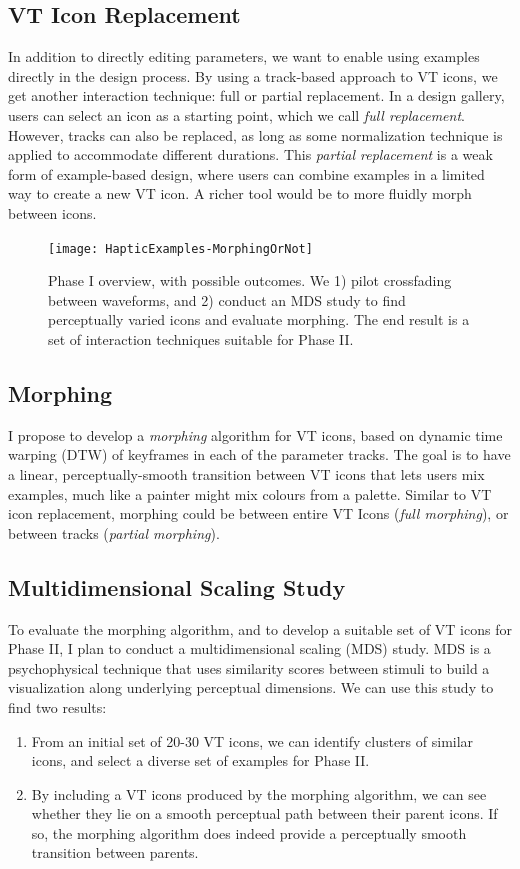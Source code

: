 \subsection{VT Icon Replacement}
In addition to directly editing parameters, we want to enable using examples directly in the design process.
By using a track-based approach to VT icons,  we get another interaction technique: full or partial replacement.
In a design gallery, users can select an icon as a starting point, which we call \emph{full replacement}.
However, tracks can also be replaced, as long as some normalization technique is applied to accommodate different durations.
This \emph{partial replacement} is a weak form of example-based design, where users can combine examples in a limited way to create a new VT icon.
A richer tool would be to more fluidly morph between icons.


\begin{figure}[htbp]
\begin{center}
\texttt{[image: HapticExamples-MorphingOrNot]}

\caption{Phase I overview, with possible outcomes. We 1) pilot crossfading between waveforms, and 2) conduct an MDS study to find perceptually varied icons and evaluate morphing. The end result is a set of interaction techniques suitable for Phase II.}
\label{fig:macaron:phaseI:overview}
\end{center}
\end{figure}

\subsection{Morphing}
I propose to develop a \emph{morphing} algorithm for VT icons, based on dynamic time warping (DTW) of keyframes in each of the parameter tracks.
The goal is to have a linear, perceptually-smooth transition between VT icons that lets users mix examples, much like a painter might mix colours from a palette.
Similar to VT icon replacement, morphing could be between entire VT Icons (\emph{full morphing}), or between tracks (\emph{partial morphing}).

\subsection{Multidimensional Scaling Study}
To evaluate the morphing algorithm, and to develop a suitable set of VT icons for Phase II, I plan to conduct a multidimensional scaling (MDS) study.
MDS is a psychophysical technique that uses similarity scores between stimuli to build a visualization along underlying perceptual dimensions.
We can use this study to find two results:
\begin{enumerate}
\item From an initial set of 20-30 VT icons, we can identify clusters of similar icons, and select a diverse set of examples for Phase II.
\item By including a VT icons produced by the morphing algorithm, we can see whether they lie on a smooth perceptual path between their parent icons. If so, the morphing algorithm does indeed provide a perceptually smooth transition between parents. 
\end{enumerate}

